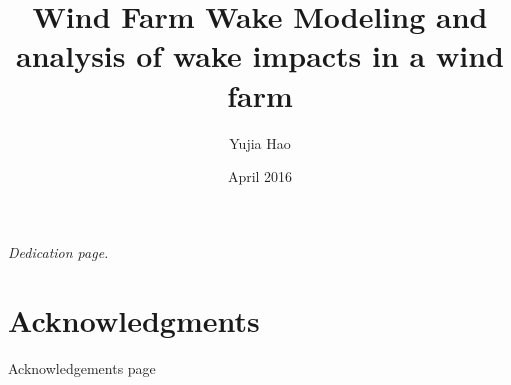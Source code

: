 \documentclass{umthesis}
\begin{document}
\title{Wind Farm Wake Modeling and analysis of wake impacts in a wind farm}
\author{Yujia Hao}
\date{April 2016} %


\frontmatter
\maketitle
\copyrightpage     %
\signaturepage

\begin{dedication}              %
  \begin{center}
    \emph{Dedication page.}
  \end{center}
\end{dedication}

\chapter{Acknowledgments}             %
Acknowledgements page
\end{document}
